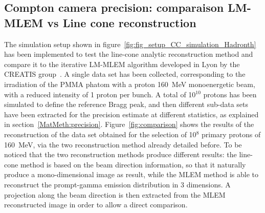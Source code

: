 \subsection{Compton camera precision: comparaison LM-MLEM vs Line cone reconstruction}
\label{Results::precision_reconstruction}

The simulation setup shown in figure~\ref{fig:fig_setup_CC_simulation_Hadronth} has been implemented to test the line-cone analytic reconstruction method and compare it to the iterative LM-MLEM algorithm developed in Lyon by the CREATIS group~\cite{maxim_filtered_2014,hilaire_compton_2014}. A single data set has been collected, corresponding to the irradiation of the PMMA phatom with a proton 160~MeV monoenergetic beam, with a reduced intensity of 1 proton per bunch. A total of 10$^10$ protons has been simulated to define the reference Bragg peak, and then different sub-data sets have been extracted for the precision estimate at different statistics, as explained in section~\ref{MatMeth:precision}. 
Figure~\ref{fig:comparison} shows the results of the reconstruction of the data set obtained for the selection of 10$^8$ primary protons of 160~MeV, via the two reconstruction method already detailed before. To be noticed that the two reconstruction methods produce different results: the line-cone method is based on the beam direction information, so that it naturally produce a mono-dimensional image as result, while the MLEM method is able to reconstruct the prompt-gamma emission distribution in 3 dimensions. A projection along the beam direction is then extracted from the MLEM reconstructed image in order to allow a direct comparison.\\  

